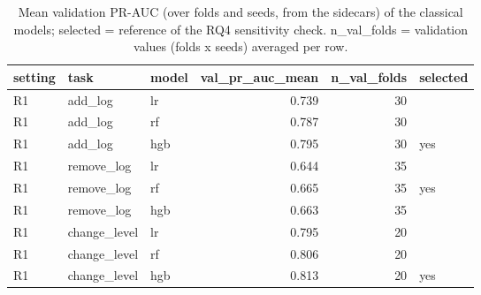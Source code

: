 \begin{table}[htbp]
\centering
\small
\caption{Mean validation PR-AUC (over folds and seeds, from the sidecars) of the classical models; selected = reference of the RQ4 sensitivity check. n\_val\_folds = validation values (folds x seeds) averaged per row.}
\label{tab:rq4_did_reference_validation_R1}
\begin{tabular}{lllrrl}
\toprule
setting & task & model & val\_pr\_auc\_mean & n\_val\_folds & selected \\
\midrule
R1 & add\_log & lr & 0.739 & 30 &  \\
R1 & add\_log & rf & 0.787 & 30 &  \\
R1 & add\_log & hgb & 0.795 & 30 & yes \\
R1 & remove\_log & lr & 0.644 & 35 &  \\
R1 & remove\_log & rf & 0.665 & 35 & yes \\
R1 & remove\_log & hgb & 0.663 & 35 &  \\
R1 & change\_level & lr & 0.795 & 20 &  \\
R1 & change\_level & rf & 0.806 & 20 &  \\
R1 & change\_level & hgb & 0.813 & 20 & yes \\
\bottomrule
\end{tabular}
\end{table}
